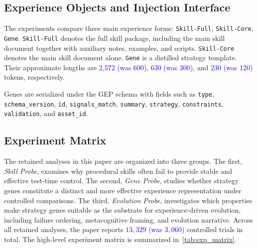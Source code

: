 \documentclass{article}
\newcommand{\blue}[1]{\textcolor{blue}{#1}}
\begin{document}
\subsection{Experience Objects and Injection Interface}
\label{app:objects_interface}

The experiments compare three main experience forms: \texttt{Skill-Full}, \texttt{Skill-Core}, \texttt{Gene}. 
\texttt{Skill-Full} denotes the full skill package, including the main skill document together with auxiliary notes, examples, and scripts. 
\texttt{Skill-Core} denotes the main skill document alone. 
\texttt{Gene} is a distilled strategy template. 
Their approximate lengths are \blue{2,572 (was 600)}, \blue{630 (was 300)}, and \blue{230 (was 120)} tokens, respectively.

Genes are serialized under the GEP schema with fields such as \texttt{type}, \texttt{schema\_version}, \texttt{id}, \texttt{signals\_match}, \texttt{summary}, \texttt{strategy}, \texttt{constraints}, \texttt{validation}, and \texttt{asset\_id}. 

\subsection{Experiment Matrix}
\label{app:exp_matrix}

The retained analyses in this paper are organized into three groups.
The first, \emph{Skill Probe}, examines why procedural skills often fail to provide stable and effective test-time control.
The second, \emph{Gene Probe}, studies whether strategy genes constitute a distinct and more effective experience representation under controlled comparisons.
The third, \emph{Evolution Probe}, investigates which properties make strategy genes suitable as the substrate for experience-driven evolution, including failure ordering, metacognitive framing, and evolution narrative.
Across all retained analyses, the paper reports \blue{$13,329$ (was $3,060$)} controlled trials in total.
The high-level experiment matrix is summarized in~\cref{tab:exp_matrix}.
\end{document}
